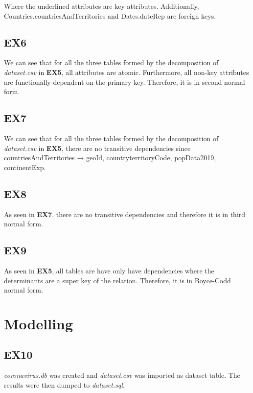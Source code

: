 \documentclass{article}
\begin{document}
Where the underlined attributes are key attributes. Additionally, Countries.countriesAndTerritories and Dates.dateRep are foreign keys. 

\subsection{EX6}
We can see that for all the three tables formed by the decomposition of \textit{dataset.csv} in \textbf{EX5}, all attributes are atomic. Furthermore, all non-key attributes are functionally dependent on the primary key. Therefore, it is in second normal form.

\subsection{EX7}
We can see that for all the three tables formed by the decomposition of \textit{dataset.csv} in \textbf{EX5}, there are no transitive dependencies since countriesAndTerritories → geoId, countryterritoryCode, popData2019, continentExp. 

\subsection{EX8} 
As seen in \textbf{EX7}, there are no transitive dependencies and therefore it is in third normal form. 

\subsection{EX9} 
As seen in \textbf{EX5}, all tables are have only have dependencies where the determinants are a super key of the relation. Therefore, it is in Boyce-Codd normal form.

\section{Modelling}
\subsection{EX10}
\textit{coronavirus.db} was created and \textit{dataset.csv} was imported as dataset table. The results were then dumped to \textit{dataset.sql}.
\end{document}
